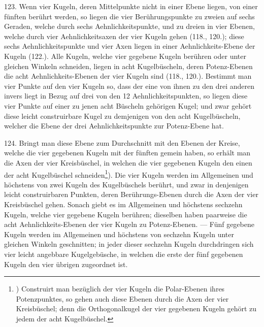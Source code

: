 123. Wenn vier Kugeln, deren Mittelpunkte nicht in
einer Ebene liegen, von einer f\"unften ber\"uhrt werden, so
liegen die vier Ber\"uhrungspunkte zu zweien auf sechs Geraden,
welche durch sechs Aehnlichkeitspunkte, und zu dreien
in vier Ebenen, welche durch vier Aehnlichkeitsaxen der
vier Kugeln gehen (118., 120.); diese sechs Aehnlichkeitspunkte
und vier Axen liegen in einer Aehnlichkeits-Ebene
der Kugeln (122.). Alle Kugeln, welche vier gegebene Kugeln
ber\"uhren oder unter gleichen Winkeln schneiden, liegen in
acht Kugelb\"uscheln, deren Potenz-Ebenen die acht Aehnlichkeits-Ebenen
der vier Kugeln sind (118., 120.). Bestimmt
man vier Punkte auf den vier Kugeln so, dass der eine von
ihnen zu den drei anderen invers liegt in Bezug auf drei
von den 12 Aehnlichkeitspunkten, so liegen diese vier Punkte
auf einer zu jenen acht B\"uscheln geh\"origen Kugel; und zwar
geh\"ort diese leicht construirbare Kugel zu demjenigen von
den acht Kugelb\"uscheln, welcher die Ebene der drei Aehnlichkeitspunkte
zur Potenz-Ebene hat.

124. Bringt man diese Ebene zum Durchschnitt mit
den Ebenen der Kreise, welche die vier gegebenen Kugeln
mit der f\"unften gemein haben, so erh\"alt man die Axen der
vier Kreisb\"uschel, in welchen die vier gegebenen Kugeln den
einen der acht Kugelb\"uschel schneiden\footnote{) %
  Construirt man bez\"uglich der vier Kugeln die Polar-Ebenen
  ihres Potenzpunktes, so gehen auch diese Ebenen durch die Axen der
  vier Kreisb\"uschel; denn die Orthogonalkugel der vier gegebenen Kugeln
  geh\"ort zu jedem der acht Kugelb\"uschel.}).
Die vier Kugeln
werden im Allgemeinen und h\"ochstens von zwei Kugeln des
Kugelb\"uschels ber\"uhrt, und zwar in denjenigen leicht construirbaren
Punkten, deren Ber\"uhrungs-Ebenen durch die
Axen der vier Kreisb\"uschel gehen. Sonach giebt es im Allgemeinen
und h\"ochstens sechzehn Kugeln, welche vier gegebene
Kugeln ber\"uhren; dieselben haben paarweise die acht
Aehnlichkeits-Ebenen der vier Kugeln zu Potenz-Ebenen. --- F\"unf
gegebene Kugeln werden im Allgemeinen und h\"ochstens
von sechzehn Kugeln unter gleichen Winkeln geschnitten;
in jeder dieser sechzehn Kugeln durchdringen sich vier leicht
angebbare Kugelgeb\"usche, in welchen die erste der f\"unf gegebenen
Kugeln den vier \"ubrigen zugeordnet ist.

\begin{center}
\makebox[15em]{\hrulefill}
\end{center}

